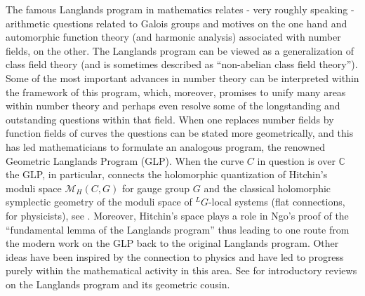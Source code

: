 \documentclass[12pt]{article}
\newcommand\CalM{\mathcal{M}}
\begin{document}
The famous Langlands program in mathematics relates - very roughly speaking - arithmetic questions related to Galois groups and motives on the one hand and automorphic function theory (and harmonic analysis) associated with number fields, on the other.  The Langlands program can be viewed as a generalization of class field theory (and is sometimes described as ``non-abelian class field theory''). 
 Some of the most important advances in number theory can be interpreted within the framework of this program, which, moreover,  promises to unify many areas within number theory and perhaps even resolve some of the longstanding and outstanding questions within that field. When one replaces number fields by function fields of curves the questions can be stated more geometrically, and this has led mathematicians to formulate an analogous program, the renowned Geometric Langlands Program (GLP). When the curve $C$ in question is over $\mathbb{C}$ the GLP, in particular, connects\cite{BeilinsonDrinfeld-HitchinQuantization,BD:2005opers} the holomorphic quantization of Hitchin's moduli space 
${\CalM}_{H} (C, G)$ for gauge group $G$ and the classical
holomorphic symplectic geometry of the moduli space of 
$^{L}G$-local systems (flat connections, for physicists), see
\cite{Fren95}. Moreover, Hitchin's space plays a role in Ngo's proof of the ``fundamental lemma of the Langlands program'' thus leading to one route from the modern work on the GLP back to the original Langlands program. Other ideas have been inspired by the 
connection to physics and have led to progress purely within the mathematical activity in this area. See  \cite{Frenkel:2004LP,Frenkel:2015LP,BenZvi-Frenkel,Frenkel-LecturesGLP} for introductory reviews 
on the Langlands program and its geometric cousin. 

%
%
\end{document}

